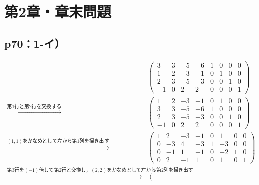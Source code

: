 \documentclass[uplatex,dvipdfmx,a4paper,10pt,fleqn]{jsarticle}
\begin{document}
\section*{第2章・章末問題}


\subsection*{p70：1-イ）}

\begin{tleftbar}
        \begin{align*} 
        &
        \left( 
            \begin{array}{cccc|cccc}
            3 & 3 & -5 & -6 & 1 & 0 & 0 & 0\\ 
            1 & 2 & -3 & -1 & 0 & 1 & 0 & 0 \\ 
            2 & 3 & -5 & -3 & 0 & 0 & 1 & 0 \\
            -1 & 0 & 2 & 2 & 0 & 0 & 0 & 1 
            \end{array}
            \right) \\
           \xrightarrow{\text{第$1$行と第$2$行を交換する}} &
            \left( \begin{array}{cccc|cccc}
                1 & 2 & -3 & -1 & 0 & 1 & 0 & 0 \\ 
                3 & 3 & -5 & -6 & 1 & 0 & 0 & 0\\ 
                2 & 3 & -5 & -3 & 0 & 0 & 1 & 0 \\
                -1 & 0 & 2 & 2 & 0 & 0 & 0 & 1 
                \end{array}
                \right)\\
           \xrightarrow{\text{$(1,1)$をかなめとして左から第1列を掃き出す}} &
           \left( \begin{array}{cccc|cccc}
            1 & 2 & -3 & -1 & 0 & 1 & 0 & 0 \\ 
            0 & -3 & 4 & -3 & 1 & -3 & 0 & 0\\ 
            0 & -1 & 1 & -1 & 0 & -2 & 1 & 0 \\
            0 & 2 & -1 & 1 & 0 & 1 & 0 & 1 
            \end{array}
            \right)\\
            \xrightarrow{\text{第$3$行を$(-1)$倍して第2行と交換し，$(2,2)$をかなめとして左から第$2$列を掃き出す}} &
           \left( \begin{array}{cccc|cccc}

\end{array}
\end{align*}
\end{tleftbar}
\end{document}
